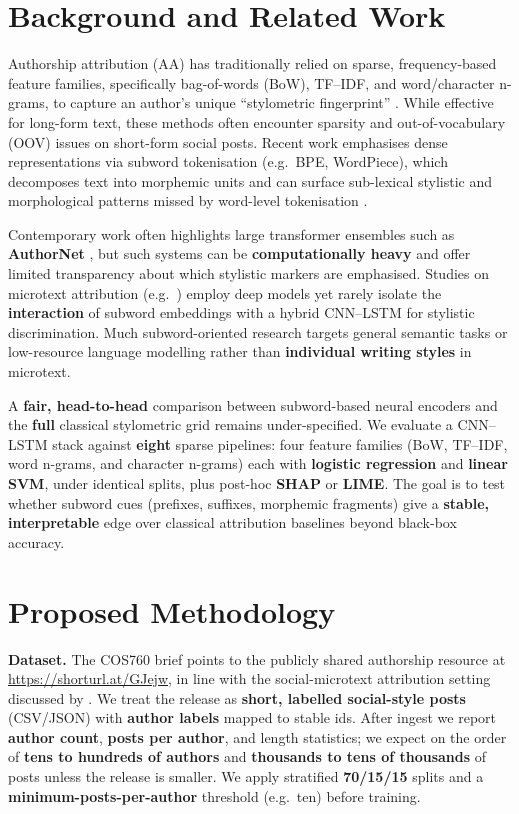 \documentclass[11pt]{article}
\begin{document}
\section{Background and Related Work}
\label{sec:related}
Authorship attribution ({AA}) has traditionally relied on sparse, frequency-based feature families, specifically bag-of-words ({BoW}), {TF--IDF}, and word/character {n}-grams, to capture an author's unique ``stylometric fingerprint'' \cite{theophilo2021authorship}. While effective for long-form text, these methods often encounter sparsity and out-of-vocabulary ({OOV}) issues on short-form social posts. Recent work emphasises dense representations via subword tokenisation (e.g.\ {BPE}, {WordPiece}), which decomposes text into morphemic units and can surface sub-lexical stylistic and morphological patterns missed by word-level tokenisation \cite{sennrich2016neural,hossain2025authornet}.

Contemporary work often highlights large transformer ensembles such as \textbf{{AuthorNet}} \cite{hossain2025authornet}, but such systems can be \textbf{computationally heavy} and offer limited transparency about which stylistic markers are emphasised. Studies on microtext attribution (e.g.\ \cite{suman2021authorship,modupe2022subword}) employ deep models yet rarely isolate the \textbf{interaction} of subword embeddings with a hybrid {CNN}--{LSTM} for stylistic discrimination. Much subword-oriented research \cite{toraman2023tokenization,drzik2026morphology} targets general semantic tasks or low-resource language modelling rather than \textbf{individual writing styles} in microtext.

A \textbf{fair, head-to-head} comparison between subword-based neural encoders and the \textbf{full} classical stylometric grid remains under-specified. We evaluate a {CNN}--{LSTM} stack against \textbf{eight} sparse pipelines: four feature families ({BoW}, {TF--IDF}, word {n}-grams, and character {n}-grams) each with \textbf{logistic regression} and \textbf{linear {SVM}}, under identical splits, plus post-hoc \textbf{{SHAP}} or \textbf{{LIME}}. The goal is to test whether subword cues (prefixes, suffixes, morphemic fragments) give a \textbf{stable, interpretable} edge over classical attribution baselines beyond black-box accuracy.

\section{Proposed Methodology}
\label{sec:method}
\noindent\textbf{Dataset.} The COS760 brief points to the publicly shared authorship resource at \url{https://shorturl.at/GJejw}, in line with the social-microtext attribution setting discussed by \cite{theophilo2021authorship,suman2021authorship,modupe2022applied}. We treat the release as \textbf{short, labelled social-style posts} ({CSV}/{JSON}) with \textbf{author labels} mapped to stable ids. After ingest we report \textbf{author count}, \textbf{posts per author}, and length statistics; we expect on the order of \textbf{tens to hundreds of authors} and \textbf{thousands to tens of thousands} of posts unless the release is smaller. We apply stratified \textbf{70/{15}/{15}} splits and a \textbf{minimum-posts-per-author} threshold (e.g.\ ten) before training.
\end{document}
